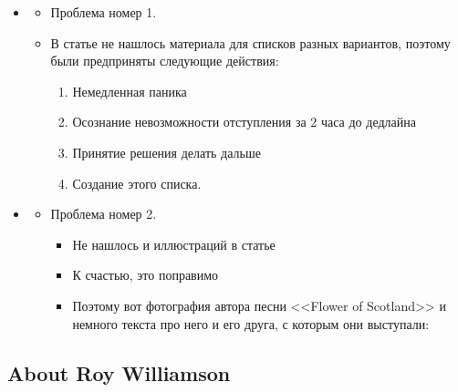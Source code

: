 \documentclass[a4paper,12pt]{article}
\begin{document}
\begin{itemize}
	\item
	\begin{itemize}
		\item Проблема номер 1.
		\item В статье не нашлось материала для списков разных вариантов, поэтому были предприняты следующие действия: 
		\begin{enumerate}
			\item Немедленная паника
			\item Осознание невозможности отступления за 2 часа до дедлайна
            \item Принятие решения делать дальше
            \item Создание этого списка.
		\end{enumerate}
	\end{itemize}
    \item
	\begin{itemize}
        \item Проблема номер 2.
    		\begin{itemize}
				\item Не нашлось и иллюстраций в статье
				\item К счастью, это поправимо
				\item Поэтому вот фотография автора песни <<Flower of Scotland>> и немного текста про него и его друга, с которым они выступали:
			\end{itemize}
	\end{itemize}
\end{itemize}

\subsection{About Roy Williamson}
\end{document}
